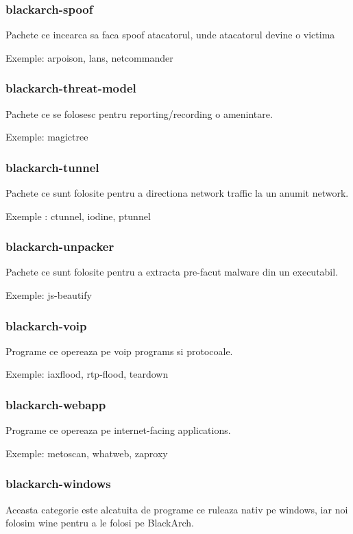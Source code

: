 \documentclass[a4paper, oneside, 11pt]{book}
\begin{document}
\subsubsection{blackarch-spoof}
Pachete ce incearca sa faca spoof atacatorul, unde atacatorul devine o victima

Exemple: arpoison, lans, netcommander

\subsubsection{blackarch-threat-model}
Pachete  ce se folosesc pentru reporting/recording o amenintare.

Exemple: magictree

\subsubsection{blackarch-tunnel}
Pachete ce sunt folosite pentru a directiona network traffic la un anumit network.

Exemple : ctunnel, iodine, ptunnel

\subsubsection{blackarch-unpacker}
Pachete ce sunt  folosite pentru a extracta pre-facut malware din un
executabil.

Exemple: js-beautify

\subsubsection{blackarch-voip}
Programe ce opereaza pe voip programs si protocoale.

Exemple: iaxflood, rtp-flood, teardown

\subsubsection{blackarch-webapp}
Programe ce opereaza pe internet-facing applications.

Exemple: metoscan, whatweb, zaproxy

\subsubsection{blackarch-windows}
Aceasta categorie este alcatuita de programe ce ruleaza nativ pe windows,  iar noi folosim wine pentru a le folosi pe BlackArch.
\end{document}
